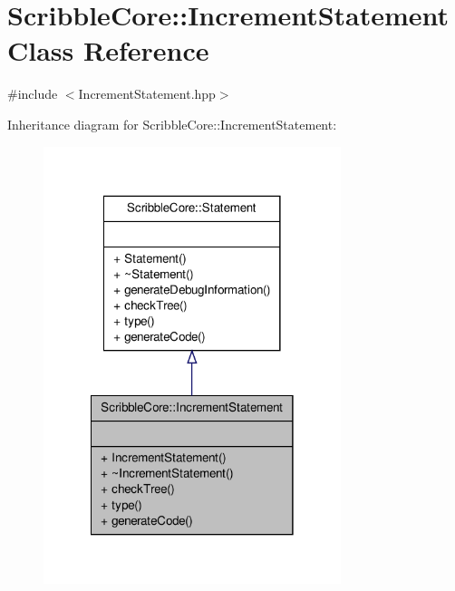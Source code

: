 \hypertarget{class_scribble_core_1_1_increment_statement}{\section{Scribble\-Core\-:\-:Increment\-Statement Class Reference}
\label{class_scribble_core_1_1_increment_statement}
}


{\ttfamily \#include $<$Increment\-Statement.\-hpp$>$}



Inheritance diagram for Scribble\-Core\-:\-:Increment\-Statement\-:
\nopagebreak
\begin{figure}[H]
\begin{center}
\leavevmode
\includegraphics[width=246pt]{class_scribble_core_1_1_increment_statement__inherit__graph}
\end{center}
\end{figure}


